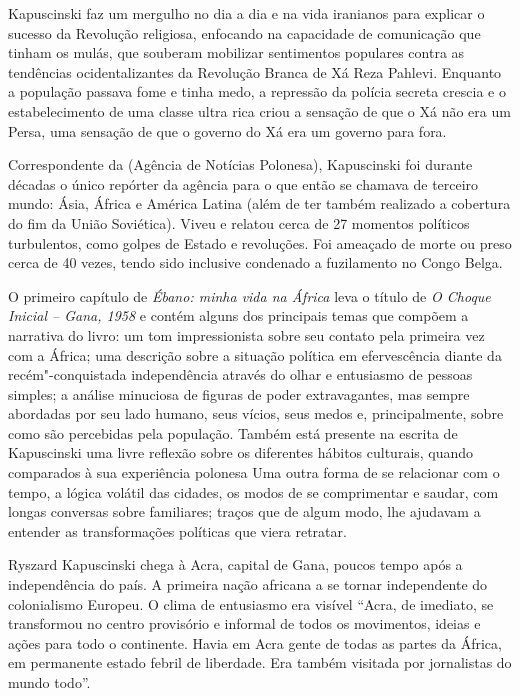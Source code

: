 Kapuscinski faz um mergulho no dia a dia e na vida iranianos para
explicar o sucesso da Revolução religiosa, enfocando na capacidade de
comunicação que tinham os mulás, que souberam mobilizar sentimentos
populares contra as tendências ocidentalizantes da Revolução Branca de
Xá Reza Pahlevi. Enquanto a população passava fome e tinha medo, a
repressão da polícia secreta crescia e o estabelecimento de uma classe
ultra rica criou a sensação de que o Xá não era um Persa, uma sensação
de que o governo do Xá era um governo para fora.

\asterisc

Correspondente da  (Agência de Notícias Polonesa), Kapuscinski foi
durante décadas o único repórter da agência para o que então se chamava
de terceiro mundo: Ásia, África e América Latina (além de ter também
realizado a cobertura do fim da União Soviética). Viveu e relatou cerca
de 27 momentos políticos turbulentos, como golpes de Estado e
revoluções. Foi ameaçado de morte ou preso cerca de 40 vezes, tendo sido
inclusive condenado a fuzilamento no Congo Belga.

O primeiro capítulo de \emph{Ébano: minha vida na África} leva o título
de \emph{O Choque Inicial -- Gana, 1958} e contém alguns dos principais
temas que compõem a narrativa do livro: um tom impressionista sobre seu
contato pela primeira vez com a África; uma descrição sobre a situação
política em efervescência diante da recém"-conquistada independência
através do olhar e entusiasmo de pessoas simples; a análise minuciosa de
figuras de poder extravagantes, mas sempre abordadas por seu lado
humano, seus vícios, seus medos e, principalmente, sobre como são
percebidas pela população. Também está presente na escrita de
Kapuscinski uma livre reflexão sobre os diferentes hábitos culturais,
quando comparados à sua experiência polonesa Uma outra forma de se
relacionar com o tempo, a lógica volátil das cidades, os modos de se
comprimentar e saudar, com longas conversas sobre familiares; traços que
de algum modo, lhe ajudavam a entender as transformações políticas que
viera retratar.

Ryszard Kapuscinski chega à Acra, capital de Gana, poucos tempo após a
independência do país. A primeira nação africana a se tornar
independente do colonialismo Europeu. O clima de entusiasmo era visível
``Acra, de imediato, se transformou no centro provisório e informal de
todos os movimentos, ideias e ações para todo o continente. Havia em
Acra gente de todas as partes da África, em permanente estado febril de
liberdade. Era também visitada por jornalistas do mundo todo''.

